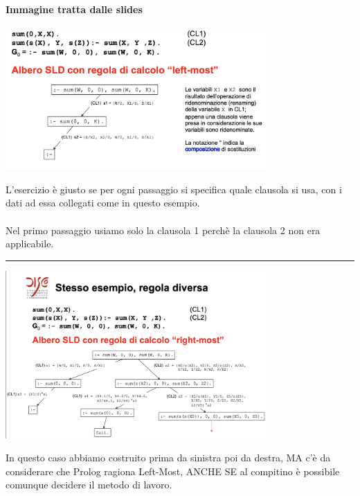 \documentclass[12pt, a4paper, openany, oneside]{book}
\begin{document}
\paragraph{Immagine tratta dalle slides}
\begin{center}
\includegraphics[width=0.75\textwidth]{8}
\end{center}
L'esercizio è giusto se per ogni passaggio si specifica quale clausola si usa,
con i dati ad essa collegati come in questo esempio. \\  \\
Nel primo passaggio usiamo solo la clausola 1 perchè la clausola 2 non era 
applicabile. 
\\
{\color{black} \rule{\linewidth}{0.3mm} }
\begin{center}
\includegraphics[width=0.75\textwidth]{9}
\end{center}
In questo caso abbiamo costruito prima da sinistra poi da destra, MA c'è da
considerare che Prolog ragiona Left-Most, ANCHE SE al compitino è possibile
comunque decidere il metodo di lavoro.
\end{document}
